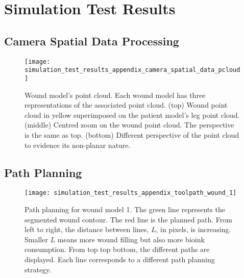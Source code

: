 \chapter{Simulation Test Results}
\label{app:simulation_test_results}

\section{Camera Spatial Data Processing}
\label{sec:simulation_test_results_appendix_camera_spatial_data}

\begin{figure}[htbp]
	\centering
	\texttt{[image: simulation\_test\_results\_appendix\_camera\_spatial\_data\_pcloud]}
	\caption{Wound model's point cloud. Each wound model has three representations of the associated point cloud. (top) Wound point cloud in yellow superimposed on the patient model's leg point cloud. (middle) Centred zoom on the wound point cloud. The perspective is the same as top. (bottom) Different perspective of the point cloud to evidence its non-planar nature. }
	\label{fig:simulation_test_results_appendix_camera_spatial_data_pcloud}
\end{figure}


\section{Path Planning}
\label{sec:simulation_test_results_appendix_path_planning}

\begin{figure}[htbp]
	\centering
	\texttt{[image: simulation\_test\_results\_appendix\_toolpath\_wound\_1]}
	\caption{Path planning for wound model 1. The green line represents the segmented wound contour. The red line is the planned path. From left to right, the distance between lines, $L$, in pixels, is increasing. Smaller $L$ means more wound filling but also more bioink consumption. From top top bottom, the different paths are displayed. Each line corresponds to a different path planning strategy.}
	\label{fig:simulation_test_results_appendix_toolpath_wound_1}
\end{figure}

